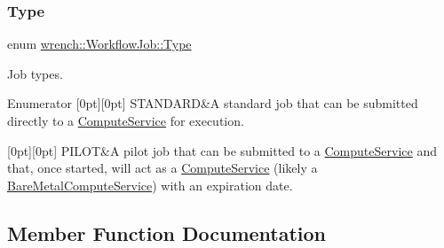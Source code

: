\subsubsection{\texorpdfstring{Type}{Type}}
{\footnotesize\ttfamily enum \hyperlink{classwrench_1_1_workflow_job_a5dcf81c50b5d221ef2a48126bf45d08b}{wrench\+::\+Workflow\+Job\+::\+Type}}



Job types. 

\begin{DoxyEnumFields}{Enumerator}
[0pt][0pt]{}\mbox{\label{classwrench_1_1_workflow_job_a5dcf81c50b5d221ef2a48126bf45d08ba12e4d89be33b16c05c2628f09e1ac0de}} 
S\+T\+A\+N\+D\+A\+RD&A standard job that can be submitted directly to a \hyperlink{classwrench_1_1_compute_service}{Compute\+Service} for execution. \\
\hline

[0pt][0pt]{}\mbox{\label{classwrench_1_1_workflow_job_a5dcf81c50b5d221ef2a48126bf45d08ba3eab6a0caa1eae9cbb7321a083125543}} 
P\+I\+L\+OT&A pilot job that can be submitted to a \hyperlink{classwrench_1_1_compute_service}{Compute\+Service} and that, once started, will act as a \hyperlink{classwrench_1_1_compute_service}{Compute\+Service} (likely a \hyperlink{classwrench_1_1_bare_metal_compute_service}{Bare\+Metal\+Compute\+Service}) with an expiration date. \\
\hline

\end{DoxyEnumFields}


\subsection{Member Function Documentation}
\mbox{\label{classwrench_1_1_workflow_job_a567b35eaf3952997a71eeedd97138794}} 
